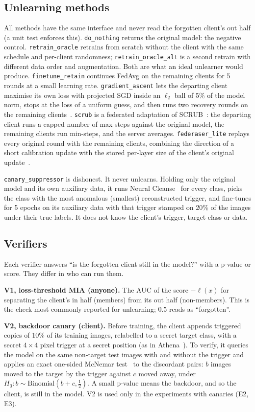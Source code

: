 \documentclass[11pt]{article}
\newcommand{\m}[1]{\texttt{#1}}
\newcommand{\dn}{\m{do\_nothing}}
\newcommand{\ro}{\m{retrain\_oracle}}
\newcommand{\roalt}{\m{retrain\_oracle\_alt}}
\newcommand{\cs}{\m{canary\_suppressor}}
\begin{document}
\subsection{Unlearning methods}

All methods have the same interface and never read the forgotten client's out
half (a unit test enforces this).
\dn{} returns the original model: the negative control.
\ro{} retrains from scratch without the client with the same schedule and
per-client randomness; \roalt{} is a second retrain with different data order
and augmentation. Both are what an ideal unlearner would produce.
\m{finetune\_retain} continues FedAvg on the remaining clients for 5 rounds at
a small learning rate. \m{gradient\_ascent} lets the departing client maximise
its own loss with projected SGD inside an $\ell_2$ ball of 5\% of the model
norm, stops at the loss of a uniform guess, and then runs two recovery rounds
on the remaining clients~\cite{halimi2022}. \m{scrub} is a federated adaptation
of SCRUB~\cite{kurmanji2023}: the departing client runs a capped number of
max-steps against the original model, the remaining clients run min-steps, and
the server averages. \m{federaser\_lite} replays every original round with the
remaining clients, combining the direction of a short calibration update with
the stored per-layer size of the client's original update~\cite{liu2021federaser}.

\cs{} is dishonest. It never unlearns. Holding only the original model and
its own auxiliary data, it runs Neural Cleanse~\cite{wang2019} for every class,
picks the class with the most anomalous (smallest) reconstructed trigger, and
fine-tunes for 5 epochs on its auxiliary data with that trigger stamped on 20\%
of the images under their true labels. It does not know the client's trigger,
target class or data.

\subsection{Verifiers}

Each verifier answers ``is the forgotten client still in the model?'' with a
p-value or score. They differ in who can run them.

\textbf{V1, loss-threshold MIA (anyone).} The AUC of the score $-\ell(x)$ for
separating the client's in half (members) from its out half (non-members).
This is the check most commonly reported for unlearning; $0.5$ reads as
``forgotten''.

\textbf{V2, backdoor canary (client).} Before training, the client appends
triggered copies of 10\% of its training images, relabelled to a secret target
class, with a secret $4\times4$ pixel trigger at a secret position (as in
Athena~\cite{sommer2022}). To verify, it queries the model on the same
non-target test images with and without the trigger and applies an exact
one-sided McNemar test~\cite{mcnemar1947} to the discordant pairs: $b$ images
moved to the target by the trigger against $c$ moved away, under
$H_0\colon b\sim\mathrm{Binomial}(b+c,\tfrac12)$. A small p-value means the
backdoor, and so the client, is still in the model. V2 is used only in the
experiments with canaries (E2, E3).
\end{document}
